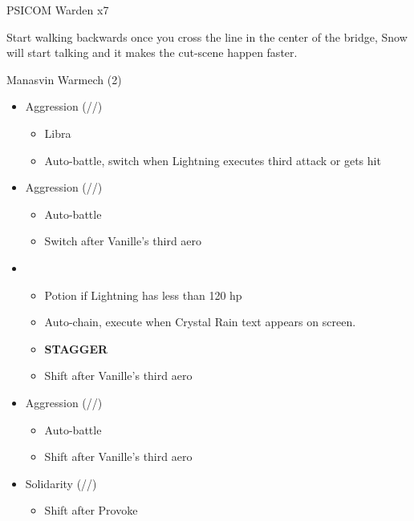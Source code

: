 \begin{multicols}{2}
\renewcommand{\second}{[2] Solidarity (\com/\sen/\med)}

\renewcommand{\third}{[3] Aggression (\com/\com/\rav)}

\renewcommand{\fourth}{[4] Aggression (\com/\com/\rav)}

\begin{battle}{PSICOM Warden x7}
 
\end{battle}

Start walking backwards once you cross the line in the center of the bridge, Snow will start talking and it makes the cut-scene happen faster.

\begin{battle}{Manasvin Warmech (2)}
\begin{itemize}
    \item \third
    \begin{itemize}
        \item Libra
        \item Auto-battle, switch when Lightning executes third attack or gets hit
    \end{itemize}
    \item \fourth
    \begin{itemize}
        \item Auto-battle
        \item Switch after Vanille's third aero
    \end{itemize}
    \item \first
    \begin{itemize}
        \item Potion if Lightning has less than 120 hp
        \item Auto-chain, execute when Crystal Rain text appears on screen.
        \item \textbf{STAGGER}
        \item Shift after Vanille's third aero
    \end{itemize}
    \item \third
    \begin{itemize}
        \item Auto-battle
        \item Shift after Vanille's third aero
    \end{itemize}
    \item \second
    \begin{itemize}
        \item Shift after Provoke
    \end{itemize}

\end{itemize}
\end{battle}
\end{multicols}
